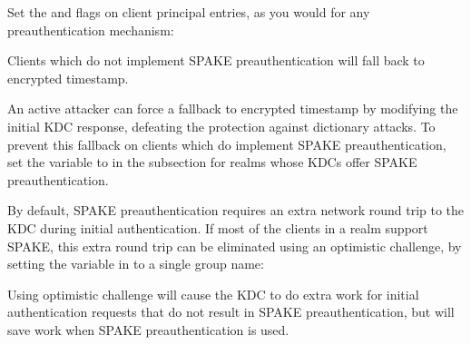 \documentclass[letterpaper,10pt,english]{sphinxmanual}
\begin{document}
\sphinxAtStartPar
Set the  and  flags on client
principal entries, as you would for any preauthentication mechanism:

\begin{sphinxVerbatim}[commandchars=\\\{\}]
    
\end{sphinxVerbatim}

\sphinxAtStartPar
Clients which do not implement SPAKE preauthentication will fall back
to encrypted timestamp.

\sphinxAtStartPar
An active attacker can force a fallback to encrypted timestamp by
modifying the initial KDC response, defeating the protection against
dictionary attacks.  To prevent this fallback on clients which do
implement SPAKE preauthentication, set the
 variable to  in the
{\hyperref[\detokenize{admin/conf_files/krb5_conf:realms}]{}} subsection for realms whose KDCs offer SPAKE
preauthentication.

\sphinxAtStartPar
By default, SPAKE preauthentication requires an extra network round
trip to the KDC during initial authentication.  If most of the clients
in a realm support SPAKE, this extra round trip can be eliminated
using an optimistic challenge, by setting the
 variable in {\hyperref[\detokenize{admin/conf_files/kdc_conf:kdcdefaults}]{}} to a
single group name:

\begin{sphinxVerbatim}[commandchars=\\\{\}]
\PYG{p}{[}\PYG{p}{]}
      
\end{sphinxVerbatim}

\sphinxAtStartPar
Using optimistic challenge will cause the KDC to do extra work for
initial authentication requests that do not result in SPAKE
preauthentication, but will save work when SPAKE preauthentication is
used.

\sphinxstepscope
\end{document}
